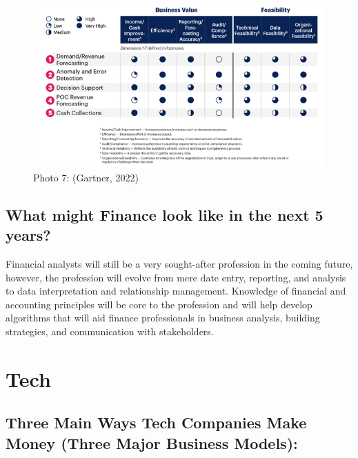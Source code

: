 \documentclass[
]{article}
\begin{document}
\begin{figure}
\centering
\includegraphics{financeaiusecases.jpg}
\caption{Photo 7: (Gartner, 2022)}
\end{figure}

\hypertarget{what-might-finance-look-like-in-the-next-5-years}{%
\subsection{What might Finance look like in the next 5 years?}\label{what-might-finance-look-like-in-the-next-5-years}}

Financial analysts will still be a very sought-after profession in the coming future, however, the profession will evolve from mere date entry, reporting, and analysis to data interpretation and relationship management. Knowledge of financial and accounting principles will be core to the profession and will help develop algorithms that will aid finance professionals in business analysis, building strategies, and communication with stakeholders.

\hypertarget{tech}{%
\section{Tech}\label{tech}}

\hypertarget{three-main-ways-tech-companies-make-money-three-major-business-models}{%
\subsection{Three Main Ways Tech Companies Make Money (Three Major Business Models):}\label{three-main-ways-tech-companies-make-money-three-major-business-models}}
\end{document}
